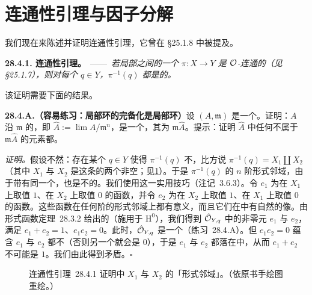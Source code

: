
\section{\trZariski{}连通性引理与\trStein{}因子分解}

我们现在来陈述并证明\trZariski{}连通性引理，它曾在 \S25.1.8 中被提及。

\textbf{28.4.1. \trZariski{}连通性引理。}\ ——\ \emph{若局部\trNoether{}\trScheme{}之间的一个\trProper\trMorphism{} $\pi\colon X\to Y$ 是 $\mathcal{O}$-连通的（见 \S25.1.7），则对每个 $q\in Y$，$\pi^{-1}(q)$ 都是\trConnected{}的。}

该证明需要下面的结果。

\textbf{28.4.A.（容易练习：局部环的完备化是局部环）}\quad 设 $(A,\mathfrak{m})$ 是一个\trNoetherian\trLocalRing。证明：$A$ 沿 $\mathfrak{m}$ 的\trCompletion，即 $\hat{A}:=\lim A/\mathfrak{m}^n$，是一个\trLocalRing，其\trMaximalIdeal{}为 $\mathfrak{m}\hat{A}$。提示：证明 $\hat{A}$ 中任何不属于 $\mathfrak{m}\hat{A}$ 的元素都\trInvertible。

\emph{证明。}\quad 假设不然：存在某个 $q\in Y$ 使得 $\pi^{-1}(q)$ 不\trConnected，比方说 $\pi^{-1}(q)=X_1\coprod X_2$（其中 $X_1$ 与 $X_2$ 是这条\trFiber{}的两个非空\trOpenSubset；见\cref{fig:formal-neighborhoods}）。于是 $\pi^{-1}(q)$ 的 $n$ 阶形式邻域，由于带有同一个\trTopologicalSpace，也是不\trConnected{}的。我们使用\trIdempotent{}这一实用技巧（\mbox{注记~3.6.3}）。令 $e_1$ 为在 $X_1$ 上取值 $1$、在 $X_2$ 上取值 $0$ 的函数，并令 $e_2$ 为在 $X_2$ 上取值 $1$、在 $X_1$ 上取值 $0$ 的函数。这些函数在任何阶的形式邻域上都有意义，而且它们在\trInverseLimit{}中有自然的像。由\mbox{形式函数定理~28.3.2} 给出的\trIsomorphism（施用于 $\mathrm{H}^0$），我们得到 $\hat{\mathcal{O}}_{Y,q}$ 中的非零元 $e_1$ 与 $e_2$，满足 $e_1+e_2=1$、$e_1e_2=0$。此时，$\hat{\mathcal{O}}_{Y,q}$ 是一个\trLocalRing（\mbox{练习~28.4.A}）。但 $e_1e_2=0$ 蕴含 $e_1$ 与 $e_2$ 都不\trInvertible（否则另一个就会是 $0$），于是 $e_1$ 与 $e_2$ 都落在\trMaximalIdeal{}中，从而 $e_1+e_2$ 不可能是 $1$。我们由此得到矛盾。\hfill$\square$

\begin{figure}[htbp]
\centering
{}
\caption{\mbox{\trZariski{}连通性引理~28.4.1} 证明中 $X_1$ 与 $X_2$ 的「形式邻域」。（依原书手绘图重绘。）}
\label{fig:formal-neighborhoods}
\end{figure}

